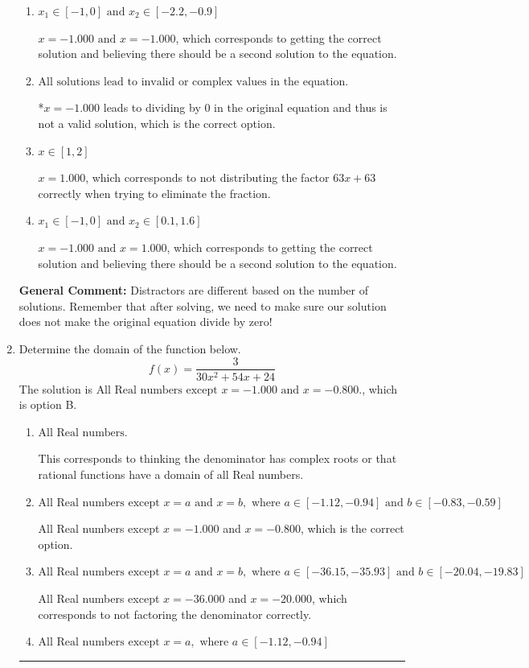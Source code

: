 \documentclass{extbook}[14pt]
\newcommand{\litem}[1]{\item #1

\rule{\textwidth}{0.4pt}}
\begin{document}
\begin{enumerate}
{\begin{enumerate}[label=\Alph*.]
$x = -1.000$, which corresponds to not checking if this value leads to dividing by 0 in the original equation and thus is not a valid solution.
\item \( x_1 \in [-1, 0] \text{ and } x_2 \in [-2.2,-0.9] \)

$x = -1.000 \text{ and } x = -1.000$, which corresponds to getting the correct solution and believing there should be a second solution to the equation.
\item \( \text{All solutions lead to invalid or complex values in the equation.} \)

*$x = -1.000$ leads to dividing by 0 in the original equation and thus is not a valid solution, which is the correct option.
\item \( x \in [1,2] \)

$x = 1.000$, which corresponds to not distributing the factor $63x + 63$ correctly when trying to eliminate the fraction.
\item \( x_1 \in [-1, 0] \text{ and } x_2 \in [0.1,1.6] \)

$x = -1.000 \text{ and } x = 1.000$, which corresponds to getting the correct solution and believing there should be a second solution to the equation.
\end{enumerate}

\textbf{General Comment:} Distractors are different based on the number of solutions. Remember that after solving, we need to make sure our solution does not make the original equation divide by zero!
}
\litem{
Determine the domain of the function below.
\[ f(x) = \frac{3}{30x^{2} +54 x + 24} \]
The solution is \( \text{All Real numbers except } x = -1.000 \text{ and } x = -0.800. \), which is option B.\begin{enumerate}[label=\Alph*.]
\item \( \text{All Real numbers.} \)

This corresponds to thinking the denominator has complex roots or that rational functions have a domain of all Real numbers.
\item \( \text{All Real numbers except } x = a \text{ and } x = b, \text{ where } a \in [-1.12, -0.94] \text{ and } b \in [-0.83, -0.59] \)

All Real numbers except $x = -1.000$ and $x = -0.800$, which is the correct option.
\item \( \text{All Real numbers except } x = a \text{ and } x = b, \text{ where } a \in [-36.15, -35.93] \text{ and } b \in [-20.04, -19.83] \)

All Real numbers except $x = -36.000$ and $x = -20.000$, which corresponds to not factoring the denominator correctly.
\item \( \text{All Real numbers except } x = a, \text{ where } a \in [-1.12, -0.94] \)


\end{enumerate}}
\end{enumerate}
\end{document}
